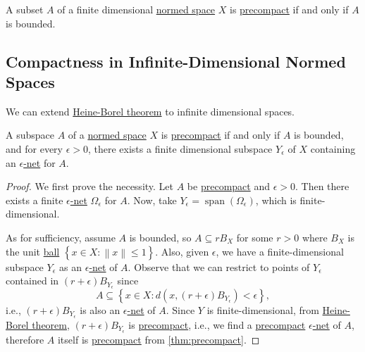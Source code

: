 \begin{theorem}\label{thm:Heine-Borel}
	A subset \(A\) of a finite dimensional \hyperref[def:normed-vector-space]{normed space} \(X\) is \hyperref[def:precompact]{precompact} if and only if \(A\) is bounded.
\end{theorem}

\subsection{Compactness in Infinite-Dimensional Normed Spaces}
We can extend \hyperref[thm:Heine-Borel]{Heine-Borel theorem} to infinite dimensional spaces.

\begin{lemma}\label{lma:appx-by-finite-dim-subspace}
	A subspace \(A\) of a \hyperref[def:normed-vector-space]{normed space} \(X\) is \hyperref[def:precompact]{precompact} if and only if \(A\) is bounded, and for every \(\epsilon > 0\), there exists a finite dimensional subspace \(Y_{\epsilon}\) of \(X\) containing an \hyperref[def:eps-net]{\(\epsilon \)-net} for \(A\).
\end{lemma}
\begin{proof}
	We first prove the necessity. Let \(A\) be \hyperref[def:precompact]{precompact} and \(\epsilon >0\). Then there exists a finite \hyperref[def:eps-net]{\(\epsilon \)-net} \(\Omega _\epsilon\) for \(A\). Now, take \(Y_{\epsilon } = \mathop{\mathrm{span}}(\Omega _\epsilon )\), which is finite-dimensional.

	As for sufficiency, assume \(A\) is bounded, so \(A \subseteq r B_X\) for some \(r > 0\) where \(B_X\) is the unit \hyperref[def:ball]{ball} \(\left\{ x\in X\colon \left\lVert x\right\rVert \leq 1 \right\} \). Also, given \(\epsilon \), we have a finite-dimensional subspace \(Y_{\epsilon }\) as an \hyperref[def:eps-net]{\(\epsilon \)-net} of \(A\). Observe that we can restrict to points of \(Y _\epsilon \) contained in \((r+\epsilon )B_{Y_{\epsilon } }\) since
	\[
		A \subseteq \left\{ x\in X\colon d(x, (r + \epsilon )B_{Y_{\epsilon } }) < \epsilon \right\},
	\]
	i.e., \((r+\epsilon )B_{Y_{\epsilon } }\) is also an \hyperref[def:eps-net]{\(\epsilon \)-net} of \(A\). Since \(Y\) is finite-dimensional, from \hyperref[thm:Heine-Borel]{Heine-Borel theorem}, \((r+\epsilon )B_{Y_{\epsilon } }\) is \hyperref[def:precompact]{precompact}, i.e., we find a \hyperref[def:precompact]{precompact}  \hyperref[def:eps-net]{\(\epsilon \)-net} of \(A\), therefore \(A\) itself is \hyperref[def:precompact]{precompact} from \autoref{thm:precompact}.
\end{proof}

